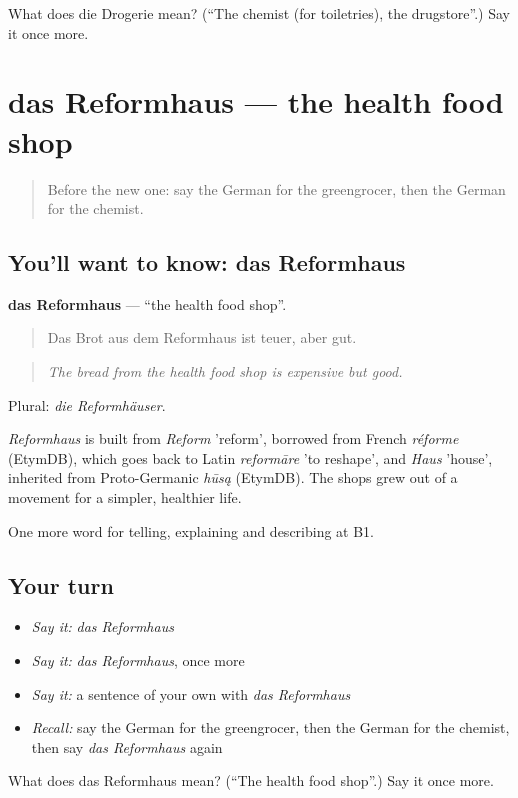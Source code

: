 \begin{tcolorbox}[breakable,colback=teal!4,colframe=teal!35!black,title={Before you move on}]
What does die Drogerie mean? (\textquotedblleft{}The chemist (for toiletries), the drugstore\textquotedblright{}.) Say it once more.
\end{tcolorbox}
\section[das Reformhaus]{das Reformhaus — the health food shop}

\label{lesson:GE-C443-reformhaus}



\begin{quote}
Before the new one: say the German for the greengrocer, then the German for the chemist.
\end{quote}

\subsection*{You'll want to know: das Reformhaus}
\textbf{das Reformhaus} — \textquotedblleft{}the health food shop\textquotedblright{}.

\begin{quote}
Das Brot aus dem Reformhaus ist teuer, aber gut.
\end{quote}

\begin{quote}
\emph{The bread from the health food shop is expensive but good.}
\end{quote}

Plural: \emph{die Reformhäuser}.

\begin{cousinweb}
\emph{Reformhaus} is built from \emph{Reform} 'reform', borrowed from French \emph{réforme} (EtymDB), which goes back to Latin \emph{reformāre} 'to reshape', and \emph{Haus} 'house', inherited from Proto-Germanic \emph{hūsą} (EtymDB). The shops grew out of a movement for a simpler, healthier life.
\end{cousinweb}

\begin{grammarlens}[title={What you've built}]
One more word for telling, explaining and describing at B1.
\end{grammarlens}

\subsection*{Your turn}
\begin{itemize}
\raggedright
  \item \emph{Say it:} \emph{das Reformhaus}
  \item \emph{Say it:} \emph{das Reformhaus}, once more
  \item \emph{Say it:} a sentence of your own with \emph{das Reformhaus}
  \item \emph{Recall:} say the German for the greengrocer, then the German for the chemist, then say \emph{das Reformhaus} again
\end{itemize}

\begin{tcolorbox}[breakable,colback=teal!4,colframe=teal!35!black,title={Before you move on}]
What does das Reformhaus mean? (\textquotedblleft{}The health food shop\textquotedblright{}.) Say it once more.
\end{tcolorbox}
